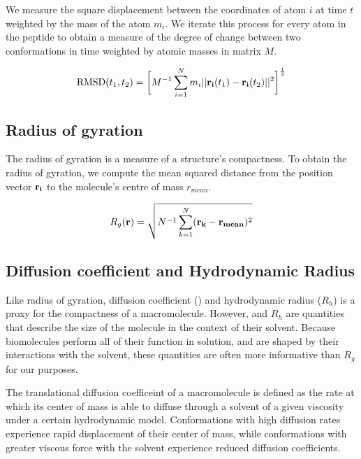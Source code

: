 We measure the square displacement between the coordinates of atom $i$ at time $t$ weighted by the mass of the atom $m_i$. We iterate this process for every atom in the peptide to obtain a measure of the degree of change between two conformations in time weighted by atomic masses in matrix $M$.

\begin{equation}
\text{RMSD}(t_1, t_2) = \bigg[ M^{-1} \sum_{i=1}^{N} m_{i} \lvert \lvert \mathbf{r_{i}}(t_{1}) - \mathbf{r_{i}}(t_{2}) \rvert \rvert^2 \bigg]^\frac{1}{2}
\end{equation}

\subsection{Radius of gyration}

The radius of gyration is a measure of a structure's compactness. To obtain the radius of gyration, we compute the mean squared distance from the position vector $\mathbf{r_i}$ to the molecule's centre of mass $r_{mean}$.

\begin{equation}
R_g(\mathbf{r}) = \sqrt{N^{-1} \sum_{k=1}^{N} (\mathbf{r_k} - \mathbf{r_{mean}})^2}
\end{equation}

\subsection{Diffusion coefficient and Hydrodynamic Radius}

Like radius of gyration, diffusion coefficient (\diffusion) and hydrodynamic radius ($R_h$) is a proxy for the compactness of a macromolecule. However, \diffusion and $R_h$ are quantities that describe the size of the molecule in the context of their solvent. Because biomolecules perform all of their function in solution, and are shaped by their interactions with the solvent, these quantities are often more informative than $R_g$ for our purposes.

The translational diffusion coefficeint of a macromolecule is defined as the rate at which its center of mass is able to diffuse through a solvent of a given viscosity under a certain hydrodynamic model. Conformations with high diffusion rates experience rapid displacement of their center of mass, while conformations with greater viscous force with the solvent experience reduced diffusion coefficients. 


